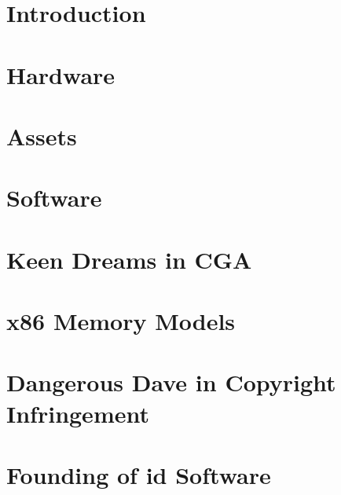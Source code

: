 \documentclass[8pt]{book}
\begin{document}
         

    \renewcommand{\rmdefault}{cmss} 
    \renewcommand{\familydefault}{\sfdefault}
    

    
    
    \cleardoublepage %
  

    \cleardoublepage %

    \setcounter{secnumdepth}{3} %
    
    
    
    
    \tableofcontents
    
    \pagebreak

	\chapter{Introduction}
      
    
  
    \chapter{Hardware}
      
      
    \chapter{Assets}
      
      
    \chapter{Software}
       
       
       
       
       
       
       
       
    \chapter{Keen Dreams in CGA}
       
       
    \appendix
    \appendixpage
    
    \chapter{x86 Memory Models}
   		

	\chapter{Dangerous Dave in Copyright Infringement}
        
        
    \chapter{Founding of id Software}
        
        


  
    \cleartoleftpage
    \thispagestyle{plain} \blankpage
    \thispagestyle{plain} \blankpage
    \thispagestyle{plain} \blankpage
\end{document}
